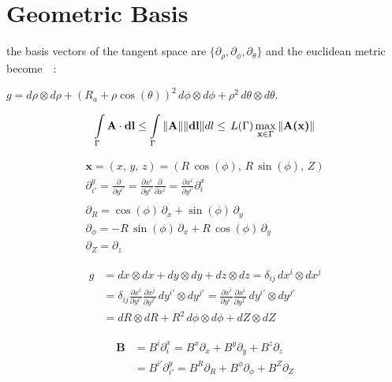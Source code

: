 \appendix

\chapter{Geometric Basis}

the basis vectors of the tangent space are $\{\partial_\rho, \partial_\phi, \partial_\theta\}$ and the euclidean metric become~~:

$g = d\rho\otimes d\rho + (R_a+\rho\cos(\theta))^2\, d\phi\otimes d\phi + \rho^2\,d\theta\otimes d\theta $.

\begin{align*}
    \int\limits_\Gamma \textbf{A}\cdot\textbf{dl} \leq \int\limits_\Gamma \Vert\textbf{A}\Vert \Vert\textbf{dl}\Vert dl \leq\, L(\Gamma)\max\limits_{\textbf{x} \in \Gamma}\Vert\textbf{A(\textbf{x})}\Vert
\end{align*}

\begin{align*}
    \textbf{x} = (x,\,y,\,z) = (R\,\cos(\phi),\,R\,\sin(\phi),\,Z)\\
    \partial_{i'}^y = \frac{\partial}{\partial y^{i'}} = \frac{\partial x^i}{\partial y^{i'}}\frac{\partial}{\partial x^i} = \frac{\partial x^i}{\partial y^{i'}}\partial_i^x\\
    \\
    \partial_R = \cos(\phi)\,\partial_x + \sin(\phi)\,\partial_y\\
    \partial_\phi = -R\,\sin(\phi)\,\partial_x + R\,\cos(\phi)\,\partial_y\\
    \partial_Z = \partial_z
\end{align*}

\begin{align*}
    g &= dx\otimes dx + dy\otimes dy + dz\otimes dz = \delta_{ij}\,dx^i\otimes dx^j\\
    &= \delta_{ij}\frac{\partial x^i}{\partial y^{i'}}\frac{\partial x^j}{\partial y^{j'}}\,dy^{i'}\otimes dy^{j'} = \frac{\partial x^i}{\partial y^{i'}}\frac{\partial x^i}{\partial y^{j'}}\,dy^{i'}\otimes dy^{j'}\\
    &= dR\otimes dR + R^2\,d\phi\otimes d\phi + dZ\otimes dZ
\end{align*}

\begin{align*}
    \textbf{B} &= B^i\partial_i^x = B^x\partial_x + B^y\partial_y + B^z\partial_z\\
     &= B^{i'}\partial_{i'}^y =  B^R\partial_R + B^\phi\partial_\phi + B^Z\partial_Z
\end{align*}


